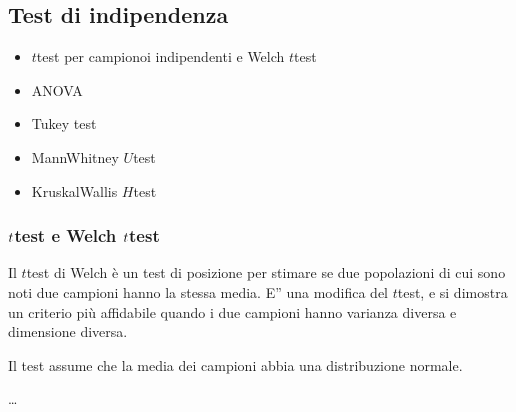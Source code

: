 \documentclass[letterpaper,10pt,italian]{jupyterBook}
\begin{document}
\subsection{Test di indipendenza}
\label{\detokenize{ch/statistics/hp-test-independence:test-di-indipendenza}}\label{\detokenize{ch/statistics/hp-test-independence::doc}}
\sphinxAtStartPar
{}
\begin{itemize}
\item {} 
\sphinxAtStartPar
\(t\)\sphinxhyphen{}test per campionoi indipendenti e Welch \(t\)\sphinxhyphen{}test

\item {} 
\sphinxAtStartPar
ANOVA

\item {} 
\sphinxAtStartPar
Tukey test

\item {} 
\sphinxAtStartPar
Mann\sphinxhyphen{}Whitney \(U\)\sphinxhyphen{}test

\item {} 
\sphinxAtStartPar
Kruskal\sphinxhyphen{}Wallis \(H\)\sphinxhyphen{}test

\end{itemize}


\subsubsection{\protect\(t\protect\)\sphinxhyphen{}test e Welch \protect\(t\protect\)\sphinxhyphen{}test}
\label{\detokenize{ch/statistics/hp-test-independence:t-test-e-welch-t-test}}
\sphinxAtStartPar
Il \(t\)\sphinxhyphen{}test di Welch è un test di posizione per stimare se due popolazioni di cui sono noti due campioni hanno la stessa media. E” una modifica del \(t\)\sphinxhyphen{}test, e si dimostra un criterio più affidabile quando i due campioni hanno varianza diversa e dimensione diversa.

\sphinxAtStartPar
{} Il test assume che la media dei campioni abbia una distribuzione normale.

\sphinxAtStartPar
…
\end{document}
